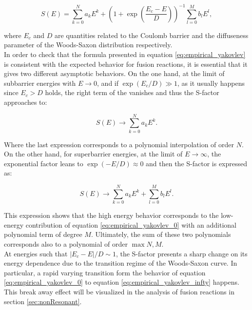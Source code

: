 \documentclass[openany]{book}
\begin{document}
\begin{equation} \label{eq:empirical_yakovlev}
	S(E) = \sum_{k=0}^{N} {a_kE^k} + \left(1 + \exp{\left( \frac{E_c - E}{D}\right)}\right)^{-1} \sum_{l=0}^{M} {b_lE^l},
\end{equation}

where $E_c$ and $D$ are quantities related to the Coulomb barrier and the diffuseness parameter of the Woods-Saxon distribution respectively. \\

In order to check that the formula presented in equation \ref{eq:empirical_yakovlev} is consistent with the expected behavior for fusion reactions, it is essential that it gives two different asymptotic behaviors. On the one hand, at the limit of subbarrier energies with $E \rightarrow 0 $, and if $\exp {(E_c/D)} \gg 1$, as it usually happens since $E_c > D$ holds, the right term of the  vanishes and thus the S-factor approaches to: 

\begin{equation} \label{eq:empirical_yakovlev_0}
	S(E) \rightarrow \sum_{k=0}^{N} {a_kE^k}. 
\end{equation}

Where the last expression corresponds to a polynomial interpolation of order $N$. On the other hand, for superbarrier energies, at the limit of $E \rightarrow \infty $, the exponential factor leans to $\exp {(-E/D)} \approx 0$ and then the S-factor is expressed as: 


\begin{equation} \label{eq:empirical_yakovlev_infty}
	S(E) \rightarrow \sum_{k=0}^{N} {a_kE^k} + \sum_{l=0}^{M} {b_lE^l}.
\end{equation}

This expression shows that the high energy behavior corresponds to the low-energy contribution of equation \ref{eq:empirical_yakovlev_0} with an additional polynomial term of degree $M$. Ultimately, the sum of these two polynomials corresponds also to a polynomial of order $\max{N, M}$. \\

At energies such that $|E_c - E|/D \sim 1$, the S-factor presents a sharp change on its energy dependence due to the transition regime of the Woods-Saxon curve. In particular, a rapid varying transition form the behavior of equation \ref{eq:empirical_yakovlev_0} to equation  \ref{eq:empirical_yakovlev_infty} happens. This break away effect will be visualized in the analysis of fusion reactions in section \ref{sec:nonResonant}. 
 
\end{document}
